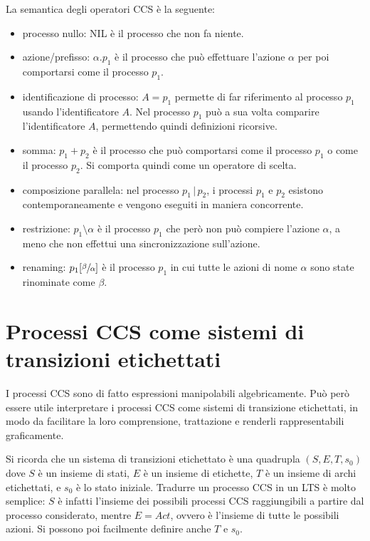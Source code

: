 La semantica degli operatori CCS è la seguente:
\begin{itemize}
    \item processo nullo: NIL è il processo che non fa niente.
    \item azione/prefisso: $\alpha.p_1$ è il processo che può effettuare
    l'azione $\alpha$ per poi comportarsi come il processo $p_1$.
    \item identificazione di processo: $A = p_1$ permette di far riferimento
    al processo $p_1$ usando l'identificatore $A$. Nel processo $p_1$ può
    a sua volta comparire l'identificatore $A$, permettendo quindi definizioni
    ricorsive.
    \item somma: $p_1 + p_2$ è il processo che può comportarsi come il
    processo $p_1$ o come il processo $p_2$. Si comporta quindi come un
    operatore di scelta.
    \item composizione parallela: nel processo $p_1 \,|\, p_2$,
    i processi $p_1$ e $p_2$ esistono contemporaneamente e vengono eseguiti
    in maniera concorrente.
    \item restrizione: $p_1 \setminus \alpha$ è il processo $p_1$ che però
    non può compiere l'azione $\alpha$, a meno che non effettui una
    sincronizzazione sull'azione.
    \item renaming: $p_1[\sfrac{\beta}{\alpha}]$ è il processo $p_1$ in
    cui tutte le azioni di nome $\alpha$ sono state rinominate come $\beta$.
\end{itemize}

\section{Processi CCS come sistemi di transizioni etichettati}
I processi CCS sono di fatto espressioni manipolabili algebricamente.
Può però essere utile interpretare i processi CCS come sistemi di transizione
etichettati, in modo da facilitare la loro comprensione, trattazione
e renderli rappresentabili graficamente.

Si ricorda che un sistema di transizioni etichettato è una quadrupla
$(S, E, T, s_0)$ dove $S$ è un insieme di stati, $E$ è un insieme di etichette,
$T$ è un insieme di archi etichettati, e $s_0$ è lo stato iniziale.
Tradurre un processo CCS in un LTS è molto semplice: $S$ è infatti l'insieme
dei possibili processi CCS raggiungibili a partire dal processo considerato,
mentre $E = Act$, ovvero è l'insieme di tutte le possibili azioni.
Si possono poi facilmente definire anche $T$ e $s_0$.

